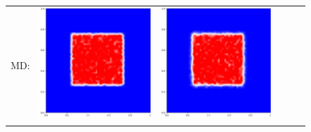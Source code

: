 \documentclass[12pt, reqno]{report}
\theoremstyle{definition}
\theoremstyle{remark}
\begin{document}
\begin{figure}[H]
\begin{tabular}{rccccc}
        MD: & 
        \includegraphics[align = c, height=\subheight]{media_paper/cmap_MD_n=0.png} & 
        \includegraphics[align = c, height=\subheight]{media_paper/cmap_MD_n=50.png} & 

\end{tabular}
\end{figure}
\end{document}
